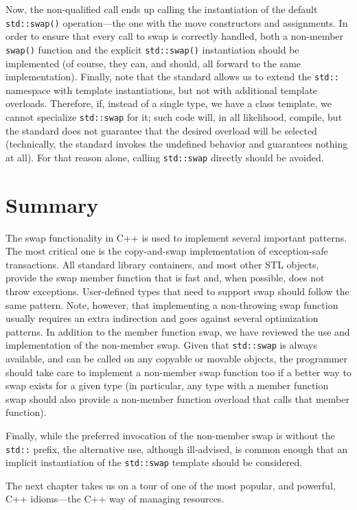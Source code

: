 Now, the non-qualified call ends up calling the instantiation of the default \texttt{std::swap()} operation---the one with the move constructors and assignments. In order to ensure that every call to swap is correctly handled, both a non-member \texttt{swap()} function and the explicit \texttt{std::swap()} instantiation should be implemented (of course, they can, and should, all forward to the same implementation). Finally, note that the standard allows us to extend the \texttt{std::} namespace with template instantiations, but not with additional template overloads. Therefore, if, instead of a single type, we have a class template, we cannot specialize \texttt{std::swap} for it; such code will, in all likelihood, compile, but the standard does not guarantee that the desired overload will be selected (technically, the standard invokes the undefined behavior and guarantees nothing at all). For that reason alone, calling \texttt{std::swap} directly should be avoided.

\section{Summary}

The swap functionality in C++ is used to implement several important patterns. The most critical one is the copy-and-swap implementation of exception-safe transactions. All standard library containers, and most other STL objects, provide the swap member function that is fast and, when possible, does not throw exceptions. User-defined types that need to support swap should follow the same pattern. Note, however, that implementing a non-throwing swap function usually requires an extra indirection and goes against several optimization patterns. In addition to the member function swap, we have reviewed the use and implementation of the non-member swap. Given that \texttt{std::swap} is always available, and can be called on any copyable or movable objects, the programmer should take care to implement a non-member swap function too if a better way to swap exists for a given type (in particular, any type with a member function swap should also provide a non-member function overload that calls that member function).

Finally, while the preferred invocation of the non-member swap is without the \texttt{std::} prefix, the alternative use, although ill-advised, is common enough that an implicit instantiation of the \texttt{std::swap} template should be considered.

The next chapter takes us on a tour of one of the most popular, and powerful, C++ idioms---the C++ way of managing resources.

